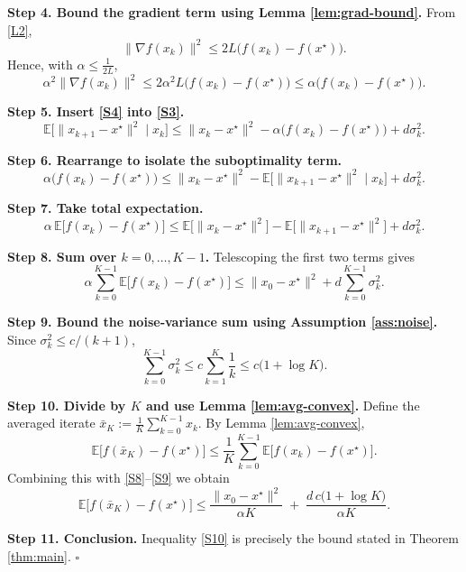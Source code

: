 \documentclass[11pt]{article}
\newcommand{\EE}{\mathbb{E}}
\begin{document}
\noindent\textbf{Step 4. Bound the gradient term using Lemma \ref{lem:grad-bound}.}  
From \eqref{L2},
\[
\|\nabla f(x_{k})\|^{2}\le 2L\bigl(f(x_{k})-f(x^{\star})\bigr).
\]
Hence, with $\alpha\le\frac{1}{2L}$,
\[
\alpha^{2}\|\nabla f(x_{k})\|^{2}
\le 2\alpha^{2}L\bigl(f(x_{k})-f(x^{\star})\bigr)
\le \alpha\bigl(f(x_{k})-f(x^{\star})\bigr). \tag{S4}
\]

\noindent\textbf{Step 5. Insert \eqref{S4} into \eqref{S3}.}  
\[
\EE\!\big[\|x_{k+1}-x^{\star}\|^{2}\mid x_{k}\big]
\le
\|x_{k}-x^{\star}\|^{2}
-\alpha\bigl(f(x_{k})-f(x^{\star})\bigr)
+d\sigma_{k}^{2}. \tag{S5}
\]

\noindent\textbf{Step 6. Rearrange to isolate the suboptimality term.}  
\[
\alpha\bigl(f(x_{k})-f(x^{\star})\bigr)
\le
\|x_{k}-x^{\star}\|^{2}
-\EE\!\big[\|x_{k+1}-x^{\star}\|^{2}\mid x_{k}\big]
+d\sigma_{k}^{2}. \tag{S6}
\]

\noindent\textbf{Step 7. Take total expectation.}  
\[
\alpha\,\EE\!\big[f(x_{k})-f(x^{\star})\big]
\le
\EE\!\big[\|x_{k}-x^{\star}\|^{2}\big]
-\EE\!\big[\|x_{k+1}-x^{\star}\|^{2}\big]
+d\sigma_{k}^{2}. \tag{S7}
\]

\noindent\textbf{Step 8. Sum over $k=0,\dots,K-1$.}  
Telescoping the first two terms gives
\[
\alpha\sum_{k=0}^{K-1}\EE\!\big[f(x_{k})-f(x^{\star})\big]
\le
\|x_{0}-x^{\star}\|^{2}
+d\sum_{k=0}^{K-1}\sigma_{k}^{2}. \tag{S8}
\]

\noindent\textbf{Step 9. Bound the noise‑variance sum using Assumption \ref{ass:noise}.}  
Since $\sigma_{k}^{2}\le c/(k+1)$,
\[
\sum_{k=0}^{K-1}\sigma_{k}^{2}
\le
c\sum_{k=1}^{K}\frac{1}{k}
\le
c\bigl(1+\log K\bigr). \tag{S9}
\]

\noindent\textbf{Step 10. Divide by $K$ and use Lemma \ref{lem:avg-convex}.}  
Define the averaged iterate $\displaystyle \bar{x}_{K}:=\frac{1}{K}\sum_{k=0}^{K-1}x_{k}$.  
By Lemma \ref{lem:avg-convex},
\[
\EE\!\big[f(\bar{x}_{K})-f(x^{\star})\big]
\le
\frac{1}{K}\sum_{k=0}^{K-1}\EE\!\big[f(x_{k})-f(x^{\star})\big].
\]
Combining this with \eqref{S8}–\eqref{S9} we obtain
\[
\EE\!\big[f(\bar{x}_{K})-f(x^{\star})\big]
\le
\frac{\|x_{0}-x^{\star}\|^{2}}{\alpha K}
\;+\;
\frac{d\,c\big(1+\log K\big)}{\alpha K}. \tag{S10}
\]

\noindent\textbf{Step 11. Conclusion.}  
Inequality \eqref{S10} is precisely the bound stated in Theorem \ref{thm:main}. \hfill $\square$
\end{document}
